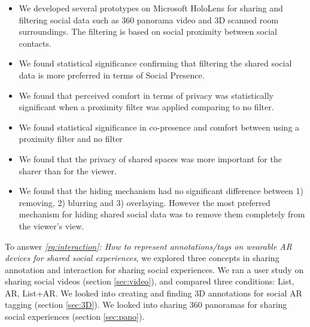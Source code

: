 \begin{itemize}
    \item{We developed several prototypes on Microsoft HoloLens for sharing and filtering social data such as 360 panorama video and 3D scanned room surroundings. The filtering is based on social proximity between social contacts.}
    \item{We found statistical significance confirming that filtering the shared social data is more preferred in terms of Social Presence.}
    \item{We found that perceived comfort in terms of privacy was statistically significant when a proximity filter was applied comparing to no filter.}
    \item{We found statistical significance in co-presence and comfort between using a proximity filter and no filter}
    \item{We found that the privacy of shared spaces was more important for the sharer than for the viewer.}
    \item{We found that the hiding mechanism had no significant difference between 1) removing, 2) blurring and 3) overlaying. However the most preferred mechanism for hiding shared social data was to remove them completely from the viewer's view.}
\end{itemize}

To answer \textit{\ref{rq:interaction}: How to represent annotations/tags on wearable AR devices for shared social experiences}, we explored three concepts in sharing annotation and interaction for sharing social experiences. We ran a user study on sharing social videos (section \ref{sec:video}), and compared three conditions: List, AR, List+AR. We looked into creating and finding 3D annotations for social AR tagging (section \ref{sec:3D}). We looked into sharing 360 panoramas for sharing social experiences (section \ref{sec:pano}). 

